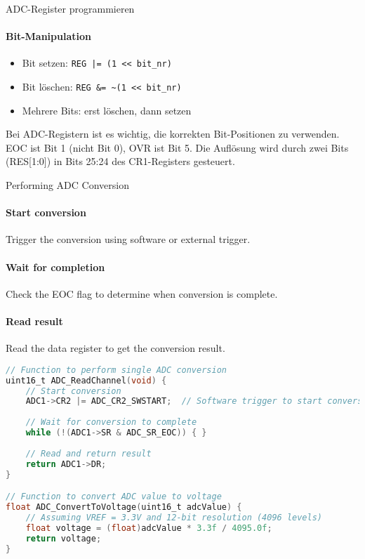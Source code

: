 \begin{concept}{ADC-Register programmieren}
    \paragraph{Bit-Manipulation}
    \begin{itemize}
        \item Bit setzen: \texttt{REG |= (1 << bit\_nr)}
        \item Bit löschen: \texttt{REG \&= \~{}(1 << bit\_nr)}
        \item Mehrere Bits: erst löschen, dann setzen
    \end{itemize}
\end{concept}
\begin{remark}
    Bei ADC-Registern ist es wichtig, die korrekten Bit-Positionen zu verwenden. EOC ist Bit 1 (nicht Bit 0), OVR ist Bit 5. Die Auflösung wird durch zwei Bits (RES[1:0]) in Bits 25:24 des CR1-Registers gesteuert.
\end{remark}

\begin{concept}{Performing ADC Conversion}
\paragraph{Start conversion}
Trigger the conversion using software or external trigger.
\paragraph{Wait for completion}
Check the EOC flag to determine when conversion is complete.
\paragraph{Read result}
Read the data register to get the conversion result.

\begin{lstlisting}[language=C, style=basesmol]
// Function to perform single ADC conversion
uint16_t ADC_ReadChannel(void) {
    // Start conversion
    ADC1->CR2 |= ADC_CR2_SWSTART;  // Software trigger to start conversion
    
    // Wait for conversion to complete
    while (!(ADC1->SR & ADC_SR_EOC)) { }
    
    // Read and return result
    return ADC1->DR;
}

// Function to convert ADC value to voltage
float ADC_ConvertToVoltage(uint16_t adcValue) {
    // Assuming VREF = 3.3V and 12-bit resolution (4096 levels)
    float voltage = (float)adcValue * 3.3f / 4095.0f;
    return voltage;
}
\end{lstlisting}
\end{concept}

